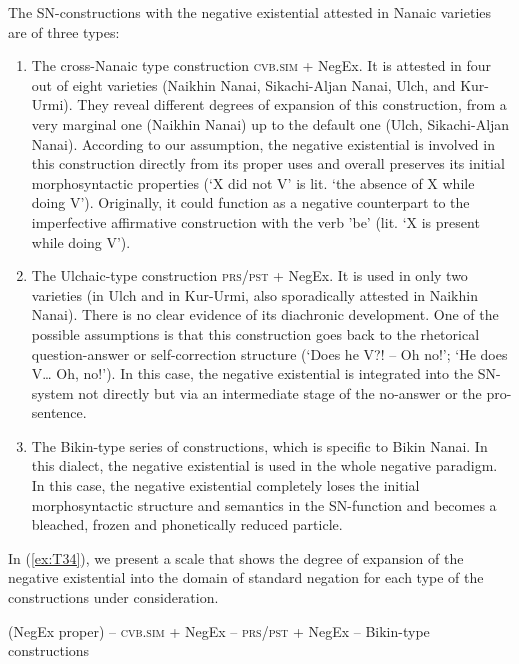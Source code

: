\documentclass[output=paper,colorlinks,citecolor=brown]{langscibook}
\begin{document}
The SN-constructions with the negative existential attested in Nanaic varieties are of three types:

\begin{enumerate}[label=(\alph*)]
    \item The cross-Nanaic type construction \textsc{cvb.sim} + NegEx. It is attested in four out of eight varieties (Naikhin Nanai, Sikachi-Aljan Nanai, Ulch, and Kur-Urmi). They reveal different degrees of expansion of this construction, from a very marginal one (Naikhin Nanai) up to the default one (Ulch, Sikachi-Aljan Nanai). According to our assumption, the negative existential is involved in this construction directly from its proper uses and overall preserves its initial morphosyntactic properties (‘X did not V’ is lit. ‘the absence of X while doing V’). Originally, it could function as a negative counterpart to the imperfective affirmative construction with the verb 'be’ (lit. ‘X is present while doing V’).
    \item The Ulchaic-type construction \textsc{prs/pst} + NegEx. It is used in only two varieties (in Ulch and in Kur-Urmi, also sporadically attested in Naikhin Nanai). There is no clear evidence of its diachronic development. One of the possible assumptions is that this construction goes back to the rhetorical question-answer or self-correction structure (‘Does he V?! – Oh no!’; ‘He does V… Oh, no!’). In this case, the negative existential is integrated into the SN-system not directly but via an intermediate stage of the no-answer or the pro-sentence.
    \item The Bikin-type series of constructions, which is specific to Bikin Nanai. In this dialect, the negative existential is used in the whole negative paradigm. In this case, the negative existential completely loses the initial morphosyntactic structure and semantics in the SN-function and becomes a bleached, frozen and phonetically reduced particle.
\end{enumerate}

In (\ref{ex:T34}), we present a scale that shows the degree of expansion of the negative existential into the domain of standard negation for each type of the constructions under consideration.

\begin{exe}
    \ex\label{ex:T34} (NegEx proper) – \textsc{cvb.sim} + NegEx – \textsc{prs/pst} + NegEx – Bikin-type constructions
\end{exe}
\end{document}
